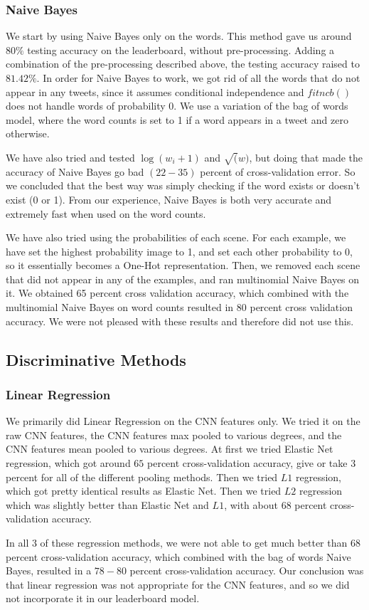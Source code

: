 \documentclass[11pt,twocolumn]{report}
\begin{document}
    \subsubsection{Naive Bayes}
    We start by using Naive Bayes only on the words. This method gave us around $80 \%$ testing accuracy on the leaderboard, without pre-processing. Adding a combination of the pre-processing described above, the testing accuracy raised to $81.42\%$. In order for Naive Bayes to work, we got rid of all the words that do not appear in any tweets, since it assumes conditional independence and $fitncb()$ does not handle words of probability $0$. We use a variation of the bag of words model, where the word counts is set to 1 if a word appears in a tweet and zero otherwise.
    \par
    We have also tried and tested $\log(w_i + 1)$ and $\sqrt(w)$, but doing that made the accuracy of Naive Bayes go bad $(22-35)$ percent of cross-validation error. So we concluded that the best way was simply checking if the word exists or doesn't exist (0 or 1). From our experience, Naive Bayes is both very accurate and extremely fast when used on the word counts.   
    \par
    We have also tried using the probabilities of each scene. For each example, we have set the highest probability image to 1, and set each other probability to 0, so it essentially becomes a One-Hot representation. Then, we removed each scene that did not appear in any of the examples, and ran multinomial Naive Bayes on it. We obtained 65 percent cross validation accuracy, which combined with the multinomial Naive Bayes on word counts resulted in 80 percent cross validation accuracy. We were not pleased with these results and therefore did not use this. 
   
    \subsection*{Discriminative Methods}

    \subsubsection{Linear Regression}
	We primarily did Linear Regression on the CNN features only. We tried it on the raw CNN features, the CNN features max pooled to various degrees, and the CNN features mean pooled to various degrees. At first we tried Elastic Net regression, which got around $65$ percent cross-validation accuracy, give or take $3$ percent for all of the different pooling methods. Then we tried $L1$ regression, which got pretty identical results as Elastic Net. Then we tried $L2$ regression which was slightly better than Elastic Net and $L1$, with about $68$ percent cross-validation accuracy. 
    \par
    In all 3 of these regression methods, we were not able to get much better than $68$ percent cross-validation accuracy, which combined with the bag of words Naive Bayes, resulted in a $78-80$ percent cross-validation accuracy. Our conclusion was that linear regression was not appropriate for the CNN features, and so we did not incorporate it in our leaderboard model. 
    
\end{document}
